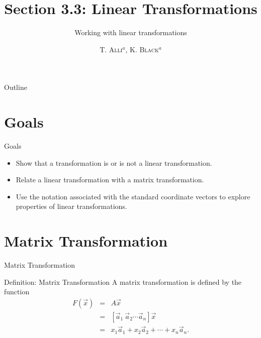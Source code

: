 \documentclass[svgnames,table,,aspectratio=169]{beamer}
\begin{document}
\author{\textsc{T. Alli$^{a}$, K. Black$^{a}$}}
\subject{Linear Algebra}


\title{Section 3.3: Linear Transformations}
\subtitle{Working with linear transformations}


\date{} %

\begin{frame}
  \titlepage
\end{frame}

\begin{frame}{Outline}
  \tableofcontents
\end{frame}


\section{Goals}

\begin{frame}{Goals}

  \begin{itemize}
  \item Show that a transformation is or is not a linear transformation.
  \item Relate a linear transformation with a matrix transformation.
  \item Use the notation associated with the standard coordinate
    vectors to explore properties of linear transformations.
  \end{itemize}

\end{frame}

\section{Matrix Transformation}

\begin{frame}{Matrix Transformation}

  \begin{block}{Definition: Matrix Transformation}
    A matrix transformation is defined by the function
    \begin{eqnarray*}
      F\left(\vec{x}\right) & = & A\vec{x} \\
                            & = & \left[ \vec{a}_1 ~ \vec{a}_2 \cdots \vec{a}_n  \right] \vec{x} \\
                            & = & x_1 \vec{a}_1 + x_2 \vec{a}_2 + \cdots + x_n \vec{a}_n.
    \end{eqnarray*}

  \end{block}

\end{frame}
\end{document}
